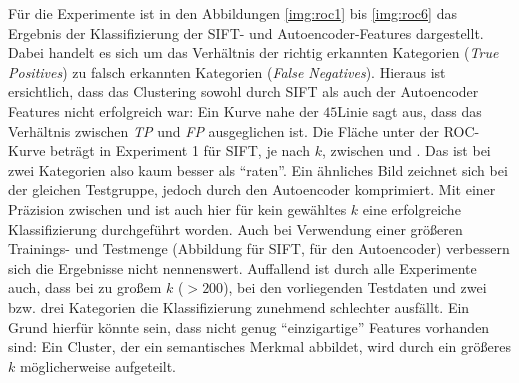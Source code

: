 Für die Experimente ist in den Abbildungen \ref{img:roc1} bis \ref{img:roc6} das Ergebnis der Klassifizierung der SIFT- und Autoencoder-Features dargestellt. Dabei handelt es sich um das Verhältnis der richtig erkannten Kategorien (\textit{True Positives}) zu falsch erkannten Kategorien (\textit{False Negatives}). Hieraus ist ersichtlich, dass das Clustering sowohl durch SIFT als auch der Autoencoder Features nicht erfolgreich war: Ein Kurve nahe der $45$\degree  Linie sagt aus, dass das Verhältnis zwischen \textit{TP} und \textit{FP} ausgeglichen ist. Die Fläche unter der ROC-Kurve beträgt in Experiment 1 für SIFT, je nach $k$, zwischen  und . Das ist bei zwei Kategorien also kaum besser als \enquote{raten}. Ein ähnliches Bild zeichnet sich bei der gleichen Testgruppe, jedoch durch den Autoencoder komprimiert. Mit einer Präzision zwischen  und  ist auch hier für kein gewähltes $k$ eine erfolgreiche Klassifizierung durchgeführt worden.\newline
Auch bei Verwendung einer größeren Trainings- und Testmenge (Abbildung  für SIFT,  für den Autoencoder) verbessern sich die Ergebnisse nicht nennenswert. 
Auffallend ist durch alle Experimente auch, dass bei zu großem $k$ ($> 200$), bei den vorliegenden Testdaten und zwei bzw. drei Kategorien die Klassifizierung zunehmend schlechter ausfällt. Ein Grund hierfür könnte sein, dass nicht genug \enquote{einzigartige} Features vorhanden sind: Ein Cluster, der ein semantisches Merkmal abbildet, wird durch ein größeres $k$ möglicherweise aufgeteilt.

